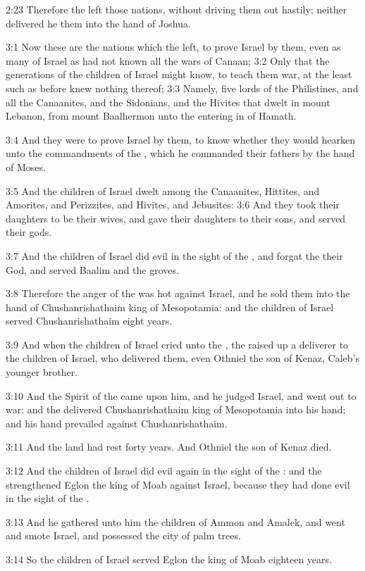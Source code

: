 2:23 Therefore the \LORD left those nations, without driving them out hastily; neither delivered he them into the hand of Joshua.

3:1 Now these are the nations which the \LORD left, to prove Israel by them, even as many of Israel as had not known all the wars of Canaan; 3:2 Only that the generations of the children of Israel might know, to teach them war, at the least such as before knew nothing thereof; 3:3 Namely, five lords of the Philistines, and all the Canaanites, and the Sidonians, and the Hivites that dwelt in mount Lebanon, from mount Baalhermon unto the entering in of Hamath.

3:4 And they were to prove Israel by them, to know whether they would hearken unto the commandments of the \LORD, which he commanded their fathers by the hand of Moses.

3:5 And the children of Israel dwelt among the Canaanites, Hittites, and Amorites, and Perizzites, and Hivites, and Jebusites: 3:6 And they took their daughters to be their wives, and gave their daughters to their sons, and served their gods.

3:7 And the children of Israel did evil in the sight of the \LORD, and forgat the \LORD their God, and served Baalim and the groves.

3:8 Therefore the anger of the \LORD was hot against Israel, and he sold them into the hand of Chushanrishathaim king of Mesopotamia: and the children of Israel served Chushanrishathaim eight years.

3:9 And when the children of Israel cried unto the \LORD, the \LORD raised up a deliverer to the children of Israel, who delivered them, even Othniel the son of Kenaz, Caleb's younger brother.

3:10 And the Spirit of the \LORD came upon him, and he judged Israel, and went out to war: and the \LORD delivered Chushanrishathaim king of Mesopotamia into his hand; and his hand prevailed against Chushanrishathaim.

3:11 And the land had rest forty years. And Othniel the son of Kenaz died.

3:12 And the children of Israel did evil again in the sight of the \LORD: and the \LORD strengthened Eglon the king of Moab against Israel, because they had done evil in the sight of the \LORD.

3:13 And he gathered unto him the children of Ammon and Amalek, and went and smote Israel, and possessed the city of palm trees.

3:14 So the children of Israel served Eglon the king of Moab eighteen years.

